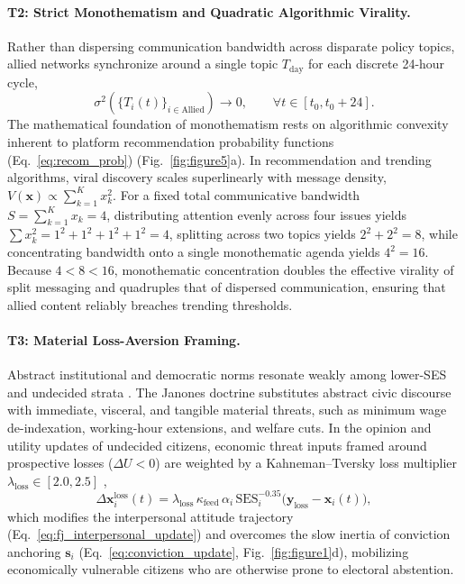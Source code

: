 \documentclass{article}
\begin{document}
\paragraph{T2: Strict Monothematism and Quadratic Algorithmic Virality.}
Rather than dispersing communication bandwidth across disparate policy topics, allied networks synchronize around a single topic $T_{\mathrm{day}}$ for each discrete 24-hour cycle,
\begin{equation}
    \sigma^2(\{T_i(t)\}_{i \in \mathrm{Allied}}) \to 0, \qquad \forall t \in [t_0, t_0 + 24].
    \label{eq:monothematism}
\end{equation}
The mathematical foundation of monothematism rests on algorithmic convexity inherent to platform recommendation probability functions (Eq.~\eqref{eq:recom_prob}) (Fig.~\ref{fig:figure5}a). In recommendation and trending algorithms, viral discovery scales superlinearly with message density, $V(\mathbf{x}) \propto \sum_{k=1}^K x_k^2$. For a fixed total communicative bandwidth $S = \sum_{k=1}^K x_k = 4$, distributing attention evenly across four issues yields $\sum x_k^2 = 1^2 + 1^2 + 1^2 + 1^2 = 4$, splitting across two topics yields $2^2 + 2^2 = 8$, while concentrating bandwidth onto a single monothematic agenda yields $4^2 = 16$. Because $4 < 8 < 16$, monothematic concentration doubles the effective virality of split messaging and quadruples that of dispersed communication, ensuring that allied content reliably breaches trending thresholds.

\paragraph{T3: Material Loss-Aversion Framing.}
Abstract institutional and democratic norms resonate weakly among lower-SES and undecided strata \citep{zaller1992nature}. The Janones doctrine substitutes abstract civic discourse with immediate, visceral, and tangible material threats, such as minimum wage de-indexation, working-hour extensions, and welfare cuts. In the opinion and utility updates of undecided citizens, economic threat inputs framed around prospective losses ($\Delta U < 0$) are weighted by a Kahneman--Tversky loss multiplier $\lambda_{\mathrm{loss}} \in [2.0, 2.5]$ \citep{kahneman1979prospect},
\begin{equation}
    \Delta \mathbf{x}_i^{\mathrm{loss}}(t) = \lambda_{\mathrm{loss}}\,\kappa_{\mathrm{feed}}\,\alpha_i\,\mathrm{SES}_i^{-0.35} \big(\mathbf{y}_{\mathrm{loss}} - \mathbf{x}_i(t)\big),
    \label{eq:loss_aversion_update}
\end{equation}
which modifies the interpersonal attitude trajectory (Eq.~\eqref{eq:fj_interpersonal_update}) and overcomes the slow inertia of conviction anchoring $\mathbf{s}_i$ (Eq.~\eqref{eq:conviction_update}, Fig.~\ref{fig:figure1}d), mobilizing economically vulnerable citizens who are otherwise prone to electoral abstention.
\end{document}
